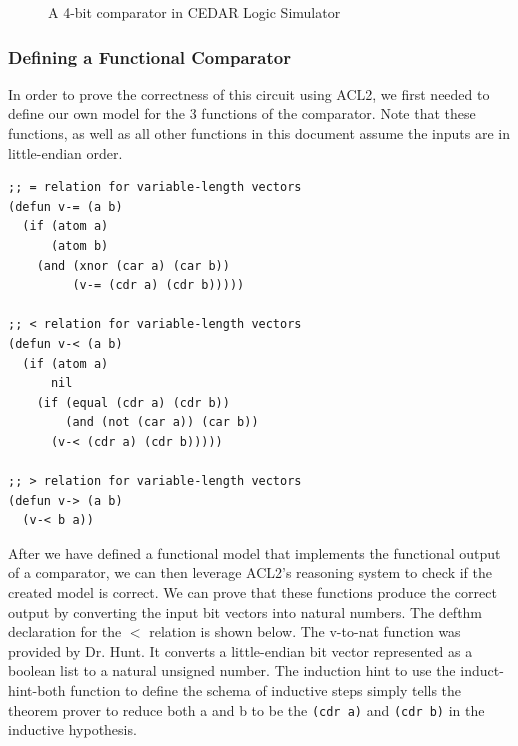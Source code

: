 \documentclass[fleqn,10pt]{SelfArx} %
\begin{document}
\begin{figure}[ht!]
  \caption{A 4-bit comparator in CEDAR Logic Simulator}
  {%
\setlength{\fboxsep}{0pt}%
\setlength{\fboxrule}{1pt}%
%
}%
\end{figure}

\subsubsection{Defining a Functional Comparator}
In order to prove the correctness of this circuit using ACL2, we first needed to define our own model for the 3 functions of the comparator. Note that these functions, as well as all other functions in this document assume the inputs are in little-endian order. 

\begin{lstlisting}
;; = relation for variable-length vectors 
(defun v-= (a b)
  (if (atom a)
      (atom b)
    (and (xnor (car a) (car b))
         (v-= (cdr a) (cdr b)))))

;; < relation for variable-length vectors
(defun v-< (a b)
  (if (atom a)
      nil
    (if (equal (cdr a) (cdr b))
        (and (not (car a)) (car b))
      (v-< (cdr a) (cdr b)))))

;; > relation for variable-length vectors
(defun v-> (a b)
  (v-< b a))
\end{lstlisting}

After we have defined a functional model that implements the functional output of a comparator, we can then leverage ACL2's reasoning system to check if the created model is correct. We can prove that these functions produce the correct output by converting the input bit vectors into natural numbers. The defthm declaration for the $<$ relation is shown below. The v-to-nat function was provided by Dr. Hunt. It converts a little-endian bit vector represented as a boolean list to a natural unsigned number. The induction hint to use the induct-hint-both function to define the schema of inductive steps simply tells the theorem prover to reduce both a and b to be the 
\lstinline{(cdr a)} and \lstinline{(cdr b)} in the inductive hypothesis. 
\end{document}
